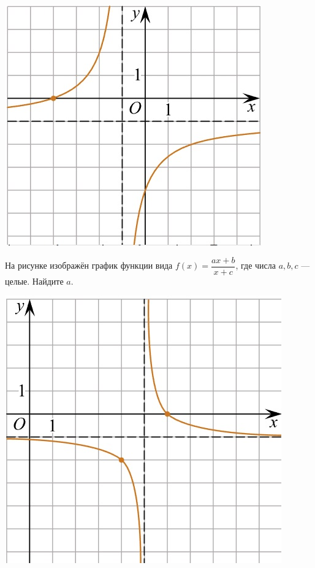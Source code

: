 \begin{class}[number=5]
\begin{listofex}
\begin{minipage}[c]{0.25\textwidth}
			\includegraphics[align=t, width=\textwidth]{pics/G101M4C5-3.jpg}
		\end{minipage}
		\item
		\begin{minipage}[t]{0.67\textwidth}
			На рисунке изображён график функции вида \(f(x)=\dfrac{ax+b}{x+c}\), где числа \(a, b, c\) --- целые. Найдите \(a\).
		\end{minipage}
		\begin{minipage}[c]{0.25\textwidth}
			\includegraphics[align=t, width=\textwidth]{pics/G101M4C5-5.jpg}

\end{minipage}
\end{listofex}
\end{class}
